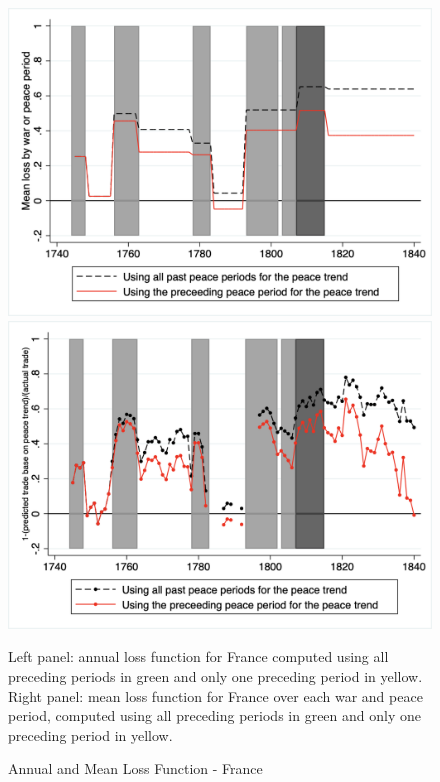 \documentclass[12pt,a4paper,notitlepage,english]{article}
\newcommand{\fontsmall}{\fontsize{10pt}{12pt}\selectfont}
\begin{document}
\begin{figure}[h!]
	\caption{Annual and Mean Loss Function - France}
	\label{fig:mean_annual_loss}
	\centering
	\includegraphics[scale=.4]{Mean_loss_function.png}
	\includegraphics[scale=.4]{Annual_loss_function.png}
	\begin{minipage}{18cm}
		\begin{flushleft}
			\fontsmall
			Left panel: annual loss function for France computed using all preceding periods in green and only one preceding period in yellow. 
			Right panel: mean loss function for France over each war and peace period, computed using all preceding periods in green and only one preceding period in yellow. 
		\end{flushleft}
	\end{minipage}
\end{figure}
\end{document}
